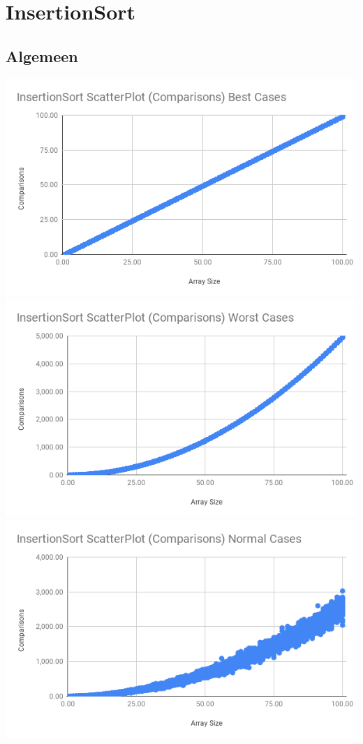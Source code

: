 \section{InsertionSort}

\subsection{Algemeen}

\includegraphics[scale=0.3]{sections/media/IS_C_BC}
\includegraphics[scale=0.3]{sections/media/IS_C_WC}
\includegraphics[scale=0.6]{sections/media/IS_C_NC}

